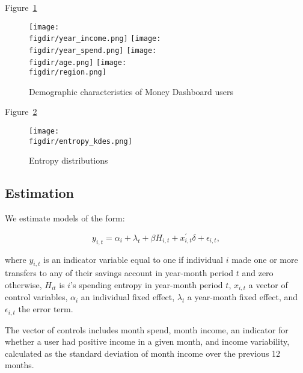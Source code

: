 Figure~\ref{fig:sample_desc}
\begin{figure}[h]
    \centering
    \caption{Demographic characteristics of Money Dashboard users}
    \label{fig:sample_desc}
    \texttt{[image: \\figdir/year\_income.png]}
    \texttt{[image: \\figdir/year\_spend.png]}
    \texttt{[image: \\figdir/age.png]}
    \texttt{[image: \\figdir/region.png]}
\end{figure}

Figure~\ref{fig:entropy_kdes}
\begin{figure}[h]
    \center \newcommand\width{\textwidth} \caption{Entropy distributions}
    \label{fig:entropy_kdes}
    \texttt{[image: \\figdir/entropy\_kdes.png]}
    \fignote{\width}{}
\end{figure}


\subsection{Estimation}%
\label{sub:estimation}

We estimate models of the form: 

\begin{equation}
    y_{i,t} = \alpha_i + \lambda_t + \beta H_{i,t} + x^\prime_{i,t} \delta +
    \epsilon_{i,t},
\end{equation}

\noindent where $y_{i,t}$ is an indicator variable equal to one if individual $i$ made
one or more transfers to any of their savings account in year-month period $t$ and zero
otherwise, $H_{it}$ is $i$'s spending entropy in year-month period $t$, $x_{i,t}$ a vector
of control variables, $\alpha_i$ an individual fixed effect, $\lambda_t$ a
year-month fixed effect, and $\epsilon_{i, t}$ the error term.

The vector of controls includes month spend, month income, an indicator for
whether a user had positive income in a given month, and income
variability, calculated as the standard deviation of month income over the
previous 12 months.

